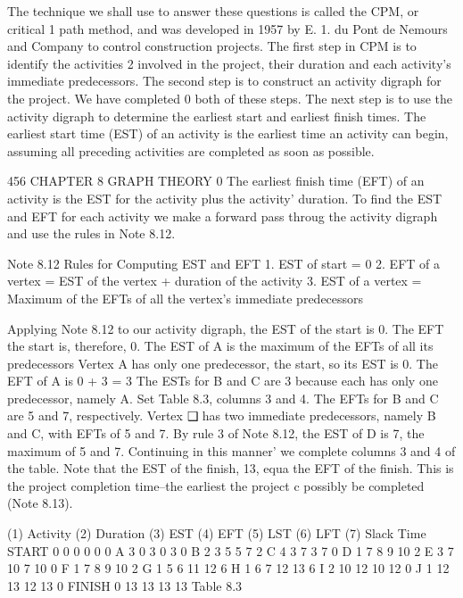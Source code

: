 The technique we shall use to answer these questions is called the CPM, or critical 1 path method, and was developed in 1957 by E. 1. du Pont de Nemours and Company 
to control construction projects. 
The first step in CPM is to identify the activities 2 involved in the project, their duration and each activity's immediate predecessors. 
The second step is to construct an activity digraph for the project. We have completed 0 both of these steps. 
The next step is to use the activity digraph to determine the earliest start and earliest finish times. 
The earliest start time (EST) of an activity is the earliest time an activity can begin, assuming all preceding activities are completed as soon as possible. 



456 CHAPTER 8 GRAPH THEORY 
0 
The earliest finish time (EFT) of an activity is the EST for the activity plus the activity' 
duration. To find the EST and EFT for each activity we make a forward pass throug 
the activity digraph and use the rules in Note 8.12. 
\begin{framed}
Note 8.12 Rules for Computing EST and EFT 
1. EST of start = 0 
2. EFT of a vertex = EST of the vertex + duration of the activity 
3. EST of a vertex = Maximum of the EFTs of all the vertex's immediate 
predecessors 
\end{framed}

Applying Note 8.12 to our activity digraph, the EST of the start is 0. The EFT 
the start is, therefore, 0. The EST of A is the maximum of the EFTs of all its predecessors 
Vertex A has only one predecessor, the start, so its EST is 0. The EFT of A is 0 + 3 = 3 
The ESTs for B and C are 3 because each has only one predecessor, namely A. Set 
Table 8.3, columns 3 and 4. The EFTs for B and C are 5 and 7, respectively. Vertex ❑ 
has two immediate predecessors, namely B and C, with EFTs of 5 and 7. By rule 3 of 
Note 8.12, the EST of D is 7, the maximum of 5 and 7. Continuing in this manner' 
we complete columns 3 and 4 of the table. Note that the EST of the finish, 13, equa 
the EFT of the finish. This is the project completion time--the earliest the project c 
possibly be completed (Note 8.13). 

(1) Activity (2) Duration (3) EST (4) EFT (5) LST (6) LFT 
(7) Slack Time START 0 0 0 0 0 0 
A 3 0 3 0 3 0 
B 2 3 5 5 7 2 
C 4 3 7 3 7 0 
D 1 7 8 9 10 2 
E 3 7 10 7 10 0 
F 1 7 8 9 10 2 
G 1 5 6 11 12 6 
H 1 6 7 12 13 6 
I 2 10 12 10 12 0 
J 1 12 13 12 13 0 
FINISH 0 13 13 13 13 Table 8.3 

